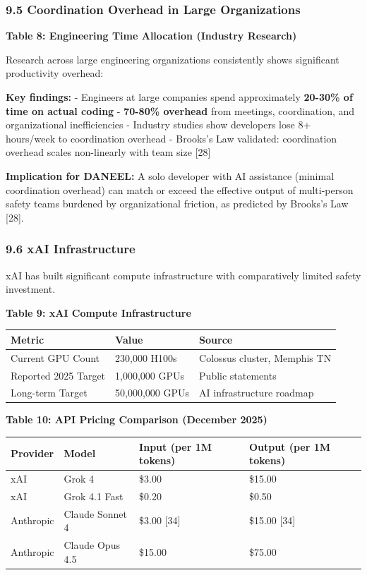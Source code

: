 \documentclass[
  11pt,
]{article}
\newcounter{none} %
\begin{document}
\subsubsection{9.5 Coordination Overhead in Large
Organizations}\label{coordination-overhead-in-large-organizations}

\textbf{Table 8: Engineering Time Allocation (Industry Research)}

Research across large engineering organizations consistently shows
significant productivity overhead:

\textbf{Key findings:} - Engineers at large companies spend
approximately \textbf{20-30\% of time on actual coding} -
\textbf{70-80\% overhead} from meetings, coordination, and
organizational inefficiencies - Industry studies show developers lose 8+
hours/week to coordination overhead - Brooks's Law validated:
coordination overhead scales non-linearly with team size {[}28{]}

\textbf{Implication for DANEEL:} A solo developer with AI assistance
(minimal coordination overhead) can match or exceed the effective output
of multi-person safety teams burdened by organizational friction, as
predicted by Brooks's Law {[}28{]}.

\subsubsection{9.6 xAI Infrastructure}\label{xai-infrastructure}

xAI has built significant compute infrastructure with comparatively
limited safety investment.

\textbf{Table 9: xAI Compute Infrastructure}

{\def\LTcaptype{none} %
\begin{longtable}[]{@{}lll@{}}
\toprule\noalign{}
Metric & Value & Source \\
\midrule\noalign{}
\endhead
\bottomrule\noalign{}
\endlastfoot
Current GPU Count & 230,000 H100s & Colossus cluster, Memphis TN \\
Reported 2025 Target & 1,000,000 GPUs & Public statements \\
Long-term Target & 50,000,000 GPUs & AI infrastructure roadmap \\
\end{longtable}
}

\textbf{Table 10: API Pricing Comparison (December 2025)}

{\def\LTcaptype{none} %
\begin{longtable}[]{@{}llll@{}}
\toprule\noalign{}
Provider & Model & Input (per 1M tokens) & Output (per 1M tokens) \\
\midrule\noalign{}
\endhead
\bottomrule\noalign{}
\endlastfoot
xAI & Grok 4 & \$3.00 & \$15.00 \\
xAI & Grok 4.1 Fast & \$0.20 & \$0.50 \\
Anthropic & Claude Sonnet 4 & \$3.00 {[}34{]} & \$15.00 {[}34{]} \\
Anthropic & Claude Opus 4.5 & \$15.00 & \$75.00 \\
\end{longtable}
}
\end{document}
